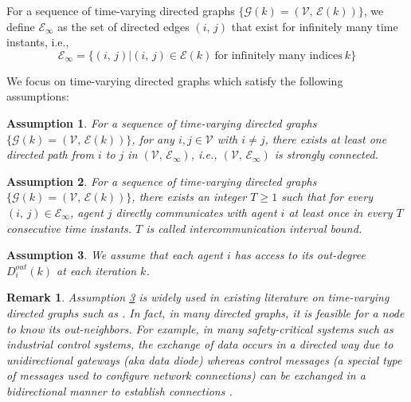\documentclass{IEEEtran}
\newtheorem{Remark}{Remark}
\newtheorem{Assumption}{Assumption}
\begin{document}
For a sequence of time-varying directed graphs $\{\mathcal{G}(k)=(\mathcal{V}, \, \mathcal{E}(k))\}$, we define $\mathcal{E}_{\infty}$ as the set of directed edges $(i, \, j)$ that exist for infinitely many time instants, i.e.,
\begin{equation}\label{infty_edges_def}
\mathcal{E}_{\infty}=\big\{(i, \, j) \big| (i, \, j) \in \mathcal{E}(k) \ \text{for infinitely many indices} \ k \big\}
\end{equation}

We focus on time-varying directed graphs which satisfy the following assumptions:
\begin{Assumption}\label{assumption_strongly_connected}
	For a sequence of time-varying directed graphs $\{\mathcal{G}(k)=(\mathcal{V}, \, \mathcal{E}(k))\}$, for any $i, j \in \mathcal{V}$ with $i\neq j$, there exists at least one directed path from $i$ to $j$ in $(\mathcal{V}, \, \mathcal{E}_{\infty})$, i.e., $(\mathcal{V}, \, \mathcal{E}_{\infty})$ is strongly connected.
\end{Assumption}
\begin{Assumption}\label{assumption_interval_bound}
	For a sequence of time-varying directed graphs $\{\mathcal{G}(k)=(\mathcal{V}, \, \mathcal{E}(k))\}$, there exists an integer $T \geq 1$ such that for every $(i, \, j) \in \mathcal{E}_{\infty}$, agent $j$ directly communicates with agent $i$ at least once in every $T$ consecutive time instants. $T$ is called intercommunication interval bound.
\end{Assumption}

\begin{Assumption}\label{assumption_out_degree}
	We assume that each agent $i$ has access to its out-degree $D_i^{out}(k)$ at each iteration $k$.
\end{Assumption}

\begin{Remark}\label{remark_out_degree}
	Assumption \ref{assumption_out_degree} is widely used in existing literature on time-varying directed graphs such as \cite{nedic2014distributed, nedic2017achieving, zhu2018differentially}. In fact, in many directed graphs, it is feasible for a node to know its out-neighbors. For example, in many safety-critical systems such as industrial control systems, the exchange of data occurs in a directed way due to unidirectional gateways (aka data diode) whereas control messages (a special type of messages used to configure network connections) can be exchanged in a bidirectional manner to establish connections \cite{scott2015tactical}.
\end{Remark}
\end{document}
